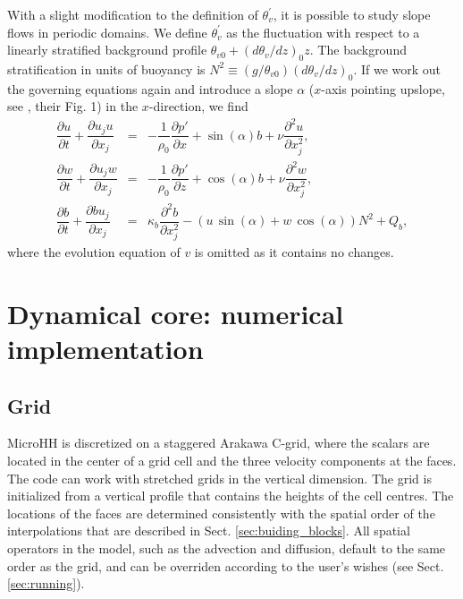 \documentclass[gmd,manuscript]{copernicus}
\begin{document}
With a slight modification to the definition of $\theta_v^\prime$, it is possible to study slope flows in periodic domains. We define $\theta_v^\prime$ as the fluctuation with respect to a linearly stratified background profile $\theta_{v0} + (d \theta_v / dz)_0 z$. The background stratification in units of buoyancy is $N^2 \equiv \left( g/\theta_{v0} \right) (d \theta_v / dz)_0$. If we work out the governing equations again and introduce a slope $\alpha$ ($x$-axis pointing upslope, see \citet{Fedorovich2009}, their Fig. 1) in the $x$-direction, we find
\begin{eqnarray}
\dfrac{\partial u}{\partial t} + \dfrac{\partial u_j u}{\partial x_j} & = & 
- \dfrac{1}{\rho_0}\dfrac{\partial p'}{\partial x} + \sin(\alpha) b + \nu \dfrac{\partial^2 u}{\partial x_j^2}\label{eq:consuslope},\\
\dfrac{\partial w}{\partial t} + \dfrac{\partial u_j w}{\partial x_j} & = & 
- \dfrac{1}{\rho_0}\dfrac{\partial p'}{\partial z} + \cos(\alpha) b + \nu \dfrac{\partial^2 w}{\partial x_j^2}\label{eq:conswslope},\\
\dfrac{\partial b}{\partial t} + \dfrac{\partial b u_j}{\partial x_j} & = & 
\kappa_b \dfrac{\partial^2 b}{\partial x_j^2} - \left (u\,\sin(\alpha) + w\,\cos(\alpha) \right) N^2 + Q_b,\label{eq:consbslope}
\end{eqnarray}
where the evolution equation of $v$ is omitted as it contains no changes.

\section{Dynamical core: numerical implementation}\label{sec:dyncorediscrete}
\subsection{Grid}\label{sec:grid}
MicroHH is discretized on a staggered Arakawa C-grid, where the scalars are located in the center of a grid cell and the three velocity components at the faces. The code can work with stretched grids in the vertical dimension. The grid is initialized from a vertical profile that contains the heights of the cell centres. The locations of the faces are determined consistently with the spatial order of the interpolations that are described in Sect. \ref{sec:buiding_blocks}. All spatial operators in the model, such as the advection and diffusion, default to the same order as the grid, and can be overriden according to the user's wishes (see Sect. \ref{sec:running}).
\end{document}
